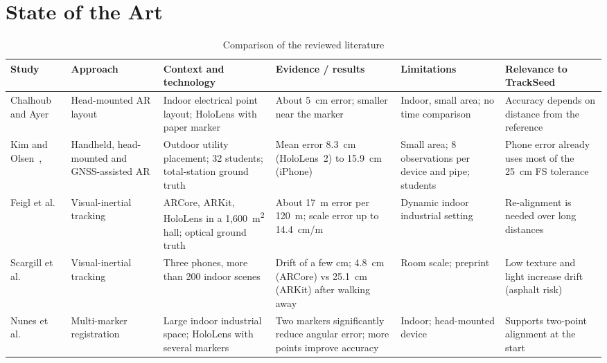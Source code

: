 \section{State of the Art}

\begin{table}[!t]
\caption{Comparison of the reviewed literature}
\label{tab:literature}
\centering
\footnotesize
\setlength{\tabcolsep}{4pt}
\renewcommand{\arraystretch}{1.18}
\begin{tabular}{|L{0.11\textwidth}|L{0.11\textwidth}|L{0.18\textwidth}|L{0.18\textwidth}|L{0.17\textwidth}|L{0.15\textwidth}|}
\hline
\textbf{Study} & \textbf{Approach} & \textbf{Context and technology} & \textbf{Evidence / results} & \textbf{Limitations} & \textbf{Relevance to TrackSeed} \\ \hline
Chalhoub and Ayer~\cite{chalhoub2019} & Head-mounted AR layout & Indoor electrical point layout; HoloLens with paper marker & About 5~cm error; smaller near the marker & Indoor, small area; no time comparison & Accuracy depends on distance from the reference \\ \hline
Kim and Olsen~\cite{kim2025isarc}, \cite{kim2024ahfe} & Handheld, head-mounted and GNSS-assisted AR & Outdoor utility placement; 32 students; total-station ground truth & Mean error 8.3~cm (HoloLens~2) to 15.9~cm (iPhone) & Small area; 8 observations per device and pipe; students & Phone error already uses most of the 25~cm FS tolerance \\ \hline
Feigl et al.~\cite{feigl2020} & Visual-inertial tracking & ARCore, ARKit, HoloLens in a 1{,}600~m\textsuperscript{2} hall; optical ground truth & About 17~m error per 120~m; scale error up to 14.4~cm/m & Dynamic indoor industrial setting & Re-alignment is needed over long distances \\ \hline
Scargill et al.~\cite{scargill2021} & Visual-inertial tracking & Three phones, more than 200 indoor scenes & Drift of a few cm; 4.8~cm (ARCore) vs 25.1~cm (ARKit) after walking away & Room scale; preprint & Low texture and light increase drift (asphalt risk) \\ \hline
Nunes et al.~\cite{nunes2023} & Multi-marker registration & Large indoor industrial space; HoloLens with several markers & Two markers significantly reduce angular error; more points improve accuracy & Indoor; head-mounted device & Supports two-point alignment at the start \\ \hline

\end{tabular}
\end{table}
